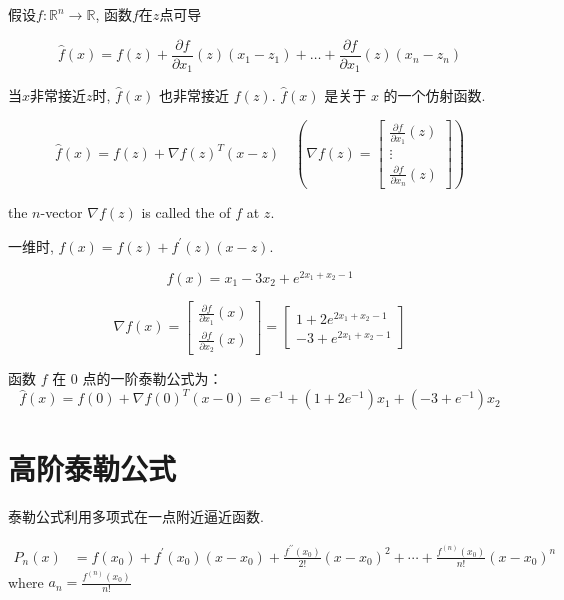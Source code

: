 \begin{definition}[一阶泰勒公式]
    假设$ f: \mathbb{R}^{n} \rightarrow \mathbb{R} $, 函数$f$在$z$点可导

    $$ \hat{f}(x)=f(z)+\frac{\partial f}{\partial x_{1}}(z)\left(x_{1}-z_{1}\right)+\ldots+\frac{\partial f}{\partial x_{1}}(z)\left(x_{n}-z_{n}\right) $$
\end{definition}

当$x$非常接近$z$时, $ \hat{f}(x) $ 也非常接近 $ f(z) $.  
$ \hat{f}(x) $ 是关于 $ x $ 的一个仿射函数. 

\begin{corollary}[一阶泰勒公式的内积形式]
    $$ \hat{f}(x)=f(z)+\nabla f(z)^{T}(x-z) \quad (\nabla f(z)=\left[\begin{array}{c}\frac{\partial f}{\partial x_{1}}(z) \\ \vdots \\ \frac{\partial f}{\partial x_{n}}(z)\end{array}\right]) $$

    the $ n $-vector $ \nabla f(z) $ is called the  of $ f $ at $ z $.
\end{corollary} 

一维时, $ \hat{f}(x)=f(z)+f^{\prime}(z)(x-z) $.

\begin{example}
    $$ f(x)=x_{1}-3 x_{2}+e^{2 x_{1}+x_{2}-1} $$

    $$ \nabla f(x)=\left[\begin{array}{l}\frac{\partial f}{\partial x_{1}}(x) \\ \frac{\partial f}{\partial x_{2}}(x)\end{array}\right]=\left[\begin{array}{l}1+2 e^{2 x_{1}+x_{2}-1} \\ -3+e^{2 x_{1}+x_{2}-1}\end{array}\right] $$

    函数 $ f $ 在 0 点的一阶泰勒公式为：
    $$ \hat{f}(x)=f(0)+\nabla f(0)^{T}(x-0)=e^{-1}+\left(1+2 e^{-1}\right) x_{1}+\left(-3+e^{-1}\right) x_{2} $$
\end{example}

\section{高阶泰勒公式}

    泰勒公式利用多项式在一点附近逼近函数.
    


\begin{corollary}[$n$阶泰勒多项式]
    $$ \begin{aligned} P_{n}(x) &=f\left(x_{0}\right)+f^{\prime}\left(x_{0}\right)\left(x-x_{0}\right)+\frac{f^{\prime \prime}\left(x_{0}\right)}{2 !}\left(x-x_{0}\right)^{2} +\cdots+\frac{f^{(n)}\left(x_{0}\right)}{n !}\left(x-x_{0}\right)^{n} \end{aligned} $$
    where $a_{n}=\frac{f^{(n)}\left(x_{0}\right)}{n !} $
\end{corollary}

